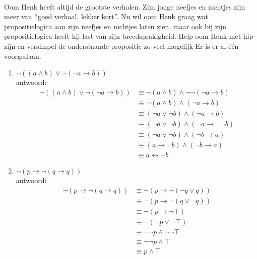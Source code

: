 \begin{answer}\mbox{}\\ %
Oom Henk heeft altijd de grootste verhalen. Zijn jonge neefjes en nichtjes zijn meer van ``goed verhaal, lekker kort''. Nu wil oom Henk graag wat propositielogica aan zijn neefjes en nichtjes laten zien, maar ook bij zijn propositielogica heeft hij last van zijn breedsprakigheid. Help oom Henk met hip zijn en versimpel de onderstaande propositie zo veel mogelijk  Er is er al één voorgedaan. 
\begin{enumerate}[label=\textit{\alph*.}]
\item $\neg ((a\land b) \lor \neg(\neg a \rightarrow b))$\\
antwoord:
\begin{align}
\neg ((a\wedge b)\vee \neg (\neg a\rightarrow b)) &\equiv \neg (a\wedge b) \wedge \neg \neg (\neg a\rightarrow b)  \tag{St-2.3.2: 9} \\
&\equiv \neg (a\wedge b) \wedge (\neg a\rightarrow b)   \tag{St-2.3.2: 1} \\
&\equiv (\neg a \vee \neg b) \wedge (\neg a\rightarrow b) \tag{St-2.3.2:10} \\
&\equiv (\neg a \vee \neg b) \wedge (\neg a\rightarrow \neg \neg b) \tag{St-2.3.2: 1} \\
&\equiv (\neg a \vee \neg b) \wedge (\neg b \rightarrow a) \tag{St-2.3.2: 7} \\
&\equiv (a \rightarrow \neg b) \wedge (\neg b \rightarrow a) \tag{St-2.3.2: 7} \\
&\equiv a \leftrightarrow \neg b \tag{St-2.3.2: 4}
\end{align}
\item $\neg (p \rightarrow \neg (q \rightarrow q))$\\
antwoord:
\begin{align}
\neg (p \rightarrow \neg (q \rightarrow q)) &\equiv \neg (p \rightarrow \neg (\neg q \vee q))  \tag{St-2.3.2: 7} \\
&\equiv \neg (p \rightarrow \neg (q \vee \neg q))  \tag{St-2.3.2: 2} \\
&\equiv \neg (p\rightarrow \neg \top)  \tag{St-2.3.2:16} \\
&\equiv \neg (\neg p \vee \neg \top) \tag{St-2.3.2: 7} \\
&\equiv \neg \neg p \wedge \neg \neg \top \tag{St-2.3.2: 9} \\
&\equiv \neg \neg p \wedge \top \tag{St-2.3.2: 1} \\
&\equiv p \wedge \top \tag{St-2.3.2: 1} \\

\end{align}
\end{enumerate}
\end{answer}
